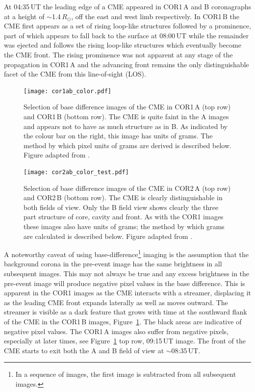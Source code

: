 At 04:35\,UT the leading edge of a CME appeared in COR1\,A and B coronagraphs at a height of $\sim$1.4\,$R_{\odot}$, off the east and west limb respectively. In COR1\,B the CME first appears as a set of rising loop-like structures followed by a prominence, part of which appears to fall back to the surface at 08:00\,UT while the remainder was ejected and follows the rising loop-like structures which eventually become the CME front. The rising prominence was not apparent at any stage of the propagation in COR1\,A and the advancing front remains the only distinguishable facet 
of the CME from this line-of-sight (LOS).
\begin{figure}
    \centering
	\texttt{[image: cor1ab\_color.pdf]}
	\caption [2008-December-12 CME observed by COR1] {Selection of base difference images of the CME in COR1\,A  
	(top row) and COR1\,B (bottom row). The CME is quite faint in the A images and appears not to have as much structure
	as in B. As indicated by the colour bar on the right, this image has units of grams. The method by which pixel units of grams are derived is described below. Figure adapted from \citep{carley2012}.}
\label{fig:STEREO_COR1A&B}
\end{figure}

\begin{figure}
    \centering
    \texttt{[image: cor2ab\_color\_test.pdf]}
	\caption [2008-December-12 CMe observed by COR2]{Selection of base difference images of the CME in COR2\,A (top 	row) and COR2\,B (bottom row). The CME is 
	clearly distinguishable in both fields of view. Only the B field view shows clearly the three part structure of core, cavity and front. As with the COR1 images these images also have units of grams; the method by which grams are calculated is described below. Figure adapted from \citep{carley2012}.}
\label{fig:STEREO_COR2A&B}
\end{figure}    

A noteworthy caveat of using base-difference\footnote{{\color{black}In a sequence of images, the first image is subtracted from all subsequent images.}} imaging is the assumption that the background corona in the pre-event image has the same brightness in all subsequent images. This may not always be true and any excess brightness in the pre-event image will produce negative pixel values in the base difference. This is apparent in the COR1 images as the CME interacts with a streamer, displacing it as the leading CME front expands laterally as well as moves outward. The streamer is visible as a dark feature that grows with time at the southward flank of the CME in the COR1\,B images, Figure~\ref{fig:STEREO_COR1A&B}. The black areas are indicative of negative pixel values. The COR1\,A images also suffer from negative pixels, especially at later times, see Figure~\ref{fig:STEREO_COR1A&B} top row, 09:15\,UT image. 
The front of the CME starts to exit both the A and B field of view at $\sim$08:35\,UT.

